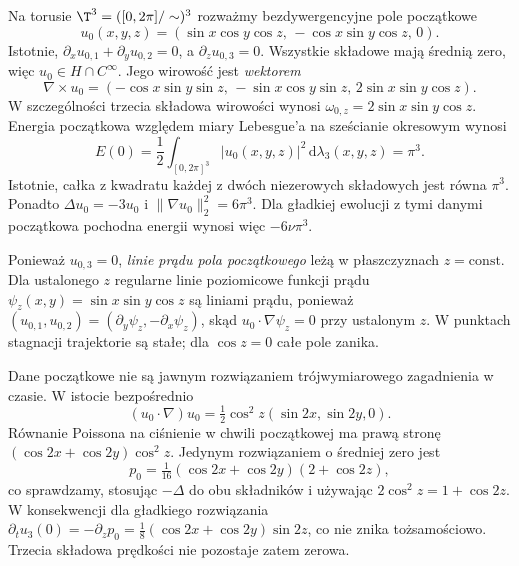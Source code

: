 \begin{przyklad}
\label{ex:pde28-TG3D}
Na torusie $\T^3=([0,2\pi]/\sim)^3$ rozważmy
bezdywergencyjne pole początkowe
\[
 u_0(x,y,z)=(\sin x\cos y\cos z,\,-\cos x\sin y\cos z,\,0).
\]
Istotnie, $\partial_x u_{0,1}+\partial_y u_{0,2}=0$,
a $\partial_z u_{0,3}=0$. Wszystkie składowe
mają średnią zero, więc $u_0\in H\cap C^\infty$.
Jego wirowość jest \emph{wektorem}
\[
 \nabla\times u_0=(-\cos x\sin y\sin z,\,
 -\sin x\cos y\sin z,\,2\sin x\sin y\cos z).
\]
W szczególności trzecia składowa wirowości wynosi
$\omega_{0,z}=2\sin x\sin y\cos z$. Energia początkowa
względem miary Lebesgue'a na sześcianie okresowym wynosi
\[
 E(0)=\frac12\int_{[0,2\pi]^3}|u_0(x,y,z)|^2
 \,\mathrm d\lambda_3(x,y,z)=\pi^3.
\]
Istotnie, całka z kwadratu każdej z dwóch
niezerowych składowych jest równa $\pi^3$.
Ponadto $\Delta u_0=-3u_0$ i
$\|\nabla u_0\|_2^2=6\pi^3$.
Dla gładkiej ewolucji z tymi danymi
początkowa pochodna energii wynosi więc $-6\nu\pi^3$.

Ponieważ $u_{0,3}=0$, \emph{linie prądu pola początkowego}
leżą w płaszczyznach $z=\mathrm{const}$. Dla ustalonego
$z$ regularne linie poziomicowe funkcji prądu
$\psi_z(x,y)=\sin x\sin y\cos z$ są liniami prądu,
ponieważ $(u_{0,1},u_{0,2})=(\partial_y\psi_z,
-\partial_x\psi_z)$, skąd $u_0\cdot\nabla\psi_z=0$
przy ustalonym $z$. W punktach stagnacji
trajektorie są stałe; dla $\cos z=0$ całe pole zanika.

Dane początkowe nie są jawnym rozwiązaniem
trójwymiarowego zagadnienia w czasie.
W istocie bezpośrednio
\[
 (u_0\cdot\nabla)u_0
 =\tfrac12\cos^2z(\sin2x,\sin2y,0).
\]
Równanie Poissona na ciśnienie w chwili początkowej
ma prawą stronę
$(\cos2x+\cos2y)\cos^2z$.
Jedynym rozwiązaniem o średniej zero jest
\[
 p_0=\tfrac1{16}(\cos2x+\cos2y)(2+\cos2z),
\]
co sprawdzamy, stosując $-\Delta$ do obu składników
i używając $2\cos^2z=1+\cos2z$.
W konsekwencji dla gładkiego rozwiązania
$\partial_t u_3(0)= -\partial_zp_0
=\tfrac18(\cos2x+\cos2y)\sin2z$,
co nie znika tożsamościowo. Trzecia składowa
prędkości nie pozostaje zatem zerowa.


\end{przyklad}
